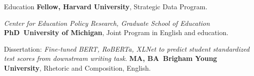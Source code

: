 \begin{rubric}{Education}
\entry*[2023 -- \dots]%
	\textbf{Fellow, Harvard University}, Strategic Data Program.
	\par\emph{Center for Education Policy Research, Graduate School of Education}
%
\entry*[2019 -- 2024]%
	\textbf{PhD~University of Michigan}, Joint Program in English and education.\par
	Dissertation: \emph{Fine-tuned BERT, RoBERTa, XLNet to predict student standardized test scores from downstream writing task}.
% 
\entry*[2010 -- 2018]%
	\textbf{MA, BA~Brigham Young University}, Rhetoric and Composition, English.
\end{rubric}
